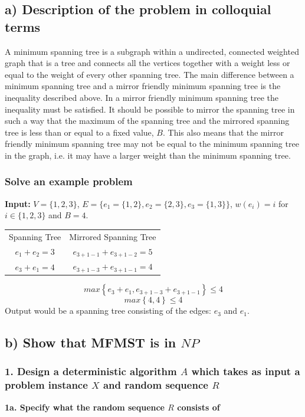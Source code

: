 \documentclass[12pt]{article}
\begin{document}
\subsection*{a) Description of the problem in colloquial terms}
A minimum spanning tree is a subgraph within a undirected, connected weighted graph that is a tree and connects all the vertices together with a weight less or equal to the weight of every other spanning tree. The main difference between a minimum spanning tree and a mirror friendly minimum spanning tree is the inequality described above. In a mirror friendly minimum spanning tree the inequality must be satisfied. It should be possible to mirror the spanning tree in such a way that the maximum of the spanning tree and the mirrored spanning tree is less than or equal to a fixed value, $B$. This also means that the mirror friendly minimum spanning tree may not be equal to the minimum spanning tree in the graph, i.e. it may have a larger weight than the minimum spanning tree.

\subsubsection*{Solve an example problem}
\textbf{Input:} $V = \{1,2,3\}$, $E = \{e_1 = \{1,2\},e_2 = \{2,3\},e_3 = \{1,3\}\}$, $w(e_i) = i$ for $i \in \{1,2,3\}$ and $B = 4$.
\begin{center}
\begin{tabular}{ c c }
Spanning Tree & Mirrored Spanning Tree\\
$e_1 + e_2 = 3$ & $e_{3+1-1} + e_{3+1-2} = 5$\\
$e_3 + e_1 = 4$ & $e_{3+1-3} + e_{3+1-1} = 4$\\
\end{tabular}
\end{center}
$$max \left\{e_3 + e_1, e_{3+1-3} + e_{3+1-1}\right\} \leq 4$$
$$max \left\{4, 4\right\} \leq 4$$
Output would be a spanning tree consisting of the edges: $e_3$ and $e_1$.
\subsection*{b) Show that MFMST is in $NP$}
\subsubsection*{1. Design a deterministic algorithm $A$ which takes as input a problem instance $X$ and random sequence $R$}

\textbf{1a. Specify what the random sequence $R$ consists of}\\
\end{document}
